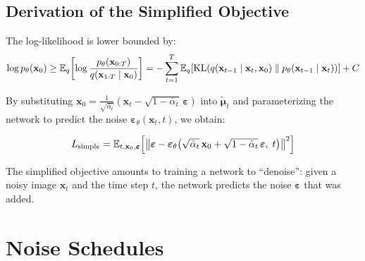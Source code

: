 \subsection{Derivation of the Simplified Objective}
\label{sec:simplified-loss}

\begin{theorem}
\label{thm:elbo-diffusion}
The log-likelihood is lower bounded by:
\begin{equation}
\log p_\theta(\mathbf{x}_0) \geq \mathbb{E}_q\!\left[\log \frac{p_\theta(\mathbf{x}_{0:T})}{q(\mathbf{x}_{1:T} \mid \mathbf{x}_0)}\right] = -\sum_{t=1}^{T} \mathbb{E}_q\!\left[\mathrm{KL}\!\left(q(\mathbf{x}_{t-1} \mid \mathbf{x}_t, \mathbf{x}_0) \;\|\; p_\theta(\mathbf{x}_{t-1} \mid \mathbf{x}_t)\right)\right] + C
\end{equation}
\end{theorem}

By substituting $\mathbf{x}_0 = \frac{1}{\sqrt{\bar{\alpha}_t}}(\mathbf{x}_t - \sqrt{1 - \bar{\alpha}_t}\,\boldsymbol{\varepsilon})$
into $\tilde{\boldsymbol{\mu}}_t$ and parameterizing the network to predict
the noise $\boldsymbol{\varepsilon}_\theta(\mathbf{x}_t, t)$, we obtain:

\begin{keyformulas}[title=\textbf{DDPM Simplified Objective}]
\begin{equation}
L_{\text{simple}} = \mathbb{E}_{t, \mathbf{x}_0, \boldsymbol{\varepsilon}}\!\left[\left\|\boldsymbol{\varepsilon} - \boldsymbol{\varepsilon}_\theta\!\left(\sqrt{\bar{\alpha}_t}\,\mathbf{x}_0 + \sqrt{1 - \bar{\alpha}_t}\,\boldsymbol{\varepsilon},\; t\right)\right\|^2\right]
\label{eq:ddpm-loss}
\end{equation}
\end{keyformulas}

\begin{intuition}
The simplified objective amounts to training a network to ``denoise'':
given a noisy image $\mathbf{x}_t$ and the time step $t$,
the network predicts the noise $\boldsymbol{\varepsilon}$ that was added.
\end{intuition}

\section{Noise Schedules}
\label{sec:noise-schedules}

